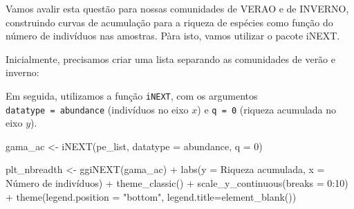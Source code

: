 \documentclass[
]{book}
\newenvironment{Shaded}{\begin{snugshade}}{\end{snugshade}}
\newcommand{\AttributeTok}[1]{\textcolor[rgb]{0.77,0.63,0.00}{#1}}
\newcommand{\DecValTok}[1]{\textcolor[rgb]{0.00,0.00,0.81}{#1}}
\newcommand{\FunctionTok}[1]{\textcolor[rgb]{0.00,0.00,0.00}{#1}}
\newcommand{\NormalTok}[1]{#1}
\newcommand{\OtherTok}[1]{\textcolor[rgb]{0.56,0.35,0.01}{#1}}
\newcommand{\SpecialCharTok}[1]{\textcolor[rgb]{0.00,0.00,0.00}{#1}}
\newcommand{\StringTok}[1]{\textcolor[rgb]{0.31,0.60,0.02}{#1}}
\begin{document}
Vamos avalir esta questão para nossas comunidades de VERAO e de INVERNO, construindo curvas de acumulação para a riqueza de espécies como função do número de indivíduos nas amostras. Pàra isto, vamos utilizar o pacote iNEXT.

Inicialmente, precisamos criar uma lista separando as comunidades de verão e inverno:

\begin{Shaded}
\end{Shaded}

Em seguida, utilizamos a função \texttt{iNEXT}, com os argumentos \texttt{datatype\ =\ \textquotesingle{}abundance\textquotesingle{}} (indivíduos no eixo \(x\)) e \texttt{q\ =\ 0} (riqueza acumulada no eixo \(y\)).

\begin{Shaded}
\begin{Highlighting}[]
\NormalTok{gama\_ac }\OtherTok{\textless{}{-}} \FunctionTok{iNEXT}\NormalTok{(pe\_list, }
                 \AttributeTok{datatype =} \StringTok{\textquotesingle{}abundance\textquotesingle{}}\NormalTok{, }
                 \AttributeTok{q =} \DecValTok{0}\NormalTok{)}

\NormalTok{plt\_nbreadth }\OtherTok{\textless{}{-}} \FunctionTok{ggiNEXT}\NormalTok{(gama\_ac) }\SpecialCharTok{+}
  \FunctionTok{labs}\NormalTok{(}\AttributeTok{y =} \StringTok{\textquotesingle{}Riqueza acumulada\textquotesingle{}}\NormalTok{,}
       \AttributeTok{x =} \StringTok{\textquotesingle{}Número de indivíduos\textquotesingle{}}\NormalTok{) }\SpecialCharTok{+}
  \FunctionTok{theme\_classic}\NormalTok{() }\SpecialCharTok{+}
  \FunctionTok{scale\_y\_continuous}\NormalTok{(}\AttributeTok{breaks =} \DecValTok{0}\SpecialCharTok{:}\DecValTok{10}\NormalTok{) }\SpecialCharTok{+}
  \FunctionTok{theme}\NormalTok{(}\AttributeTok{legend.position =} \StringTok{"bottom"}\NormalTok{, }
        \AttributeTok{legend.title=}\FunctionTok{element\_blank}\NormalTok{())}
\end{Highlighting}
\end{Shaded}
\end{document}
